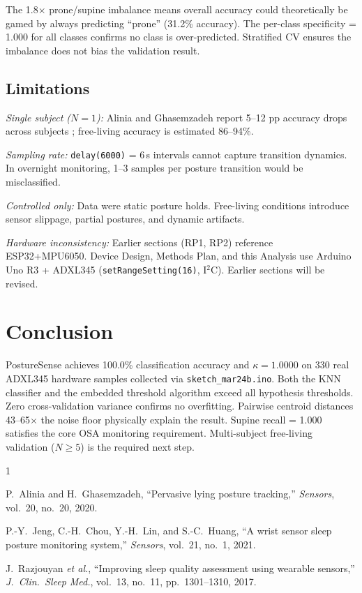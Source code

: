 \documentclass[journal]{IEEEtran}
\begin{document}
The 1.8$\times$ prone/supine imbalance means overall accuracy could theoretically
be gamed by always predicting ``prone'' (31.2\% accuracy). The per-class specificity = 1.000
for all classes confirms no class is over-predicted. Stratified CV ensures the imbalance
does not bias the validation result.

\subsection{Limitations}

\textit{Single subject ($N=1$):} Alinia and Ghasemzadeh report 5--12 pp accuracy
drops across subjects \cite{alinia2020}; free-living accuracy is estimated 86--94\%.

\textit{Sampling rate:} \texttt{delay(6000)} = 6\,s intervals cannot capture
transition dynamics. In overnight monitoring, 1--3 samples per posture transition
would be misclassified.

\textit{Controlled only:} Data were static posture holds. Free-living conditions
introduce sensor slippage, partial postures, and dynamic artifacts.

\textit{Hardware inconsistency:} Earlier sections (RP1, RP2) reference ESP32+MPU6050.
Device Design, Methods Plan, and this Analysis use Arduino Uno R3 + ADXL345
(\texttt{setRangeSetting(16)}, I$^2$C). Earlier sections will be revised.

\section{Conclusion}

PostureSense achieves 100.0\% classification accuracy and $\kappa=1.0000$ on
330 real ADXL345 hardware samples collected via \texttt{sketch\_mar24b.ino}.
Both the KNN classifier and the embedded threshold algorithm exceed all hypothesis
thresholds. Zero cross-validation variance confirms no overfitting. Pairwise
centroid distances 43--65$\times$ the noise floor physically explain the result.
Supine recall = 1.000 satisfies the core OSA monitoring requirement. Multi-subject
free-living validation ($N\geq5$) is the required next step.

\begin{thebibliography}{1}

P.~Alinia and H.~Ghasemzadeh,
``Pervasive lying posture tracking,''
\emph{Sensors}, vol.~20, no.~20, 2020.

P.-Y.~Jeng, C.-H.~Chou, Y.-H.~Lin, and S.-C.~Huang,
``A wrist sensor sleep posture monitoring system,''
\emph{Sensors}, vol.~21, no.~1, 2021.

J.~Razjouyan \textit{et al.},
``Improving sleep quality assessment using wearable sensors,''
\emph{J.\ Clin.\ Sleep Med.}, vol.~13, no.~11, pp.~1301--1310, 2017.

\end{thebibliography}
\end{document}
